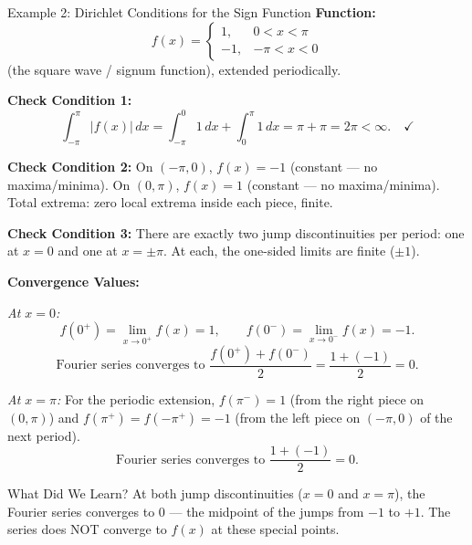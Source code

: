 \documentclass[12pt,a4paper]{article}
\begin{document}
\begin{infobox}{Example 2: Dirichlet Conditions for the Sign Function}
\textbf{Function:}
\[
   f(x) = \begin{cases} 1, & 0 < x < \pi \\ -1, & -\pi < x < 0 \end{cases}
\]
(the square wave / signum function), extended periodically.

\medskip
\textbf{Check Condition 1:}
\[
   \int_{-\pi}^{\pi} |f(x)|\,dx = \int_{-\pi}^{0} 1\,dx + \int_{0}^{\pi} 1\,dx = \pi + \pi = 2\pi < \infty. \quad \checkmark
\]

\textbf{Check Condition 2:}
On $(-\pi, 0)$, $f(x)=-1$ (constant --- no maxima/minima). On $(0,\pi)$, $f(x)=1$ (constant --- no maxima/minima). Total extrema: zero local extrema inside each piece, finite. \checkmark

\textbf{Check Condition 3:}
There are exactly two jump discontinuities per period: one at $x=0$ and one at $x=\pm\pi$. At each, the one-sided limits are finite ($\pm 1$). \checkmark

\medskip
\textbf{Convergence Values:}

\textit{At $x=0$:}
\[
   f(0^+) = \lim_{x\to 0^+} f(x) = 1, \qquad f(0^-) = \lim_{x\to 0^-} f(x) = -1.
\]
\[
   \text{Fourier series converges to } \frac{f(0^+)+f(0^-)}{2} = \frac{1+(-1)}{2} = \boxed{0}.
\]

\textit{At $x=\pi$:}
For the periodic extension, $f(\pi^-)=1$ (from the right piece on $(0,\pi)$) and $f(\pi^+)=f(-\pi^+)=-1$ (from the left piece on $(-\pi,0)$ of the next period).
\[
   \text{Fourier series converges to } \frac{1+(-1)}{2} = \boxed{0}.
\]
\end{infobox}

\begin{learnbox}{What Did We Learn?}
At both jump discontinuities ($x=0$ and $x=\pi$), the Fourier series converges to $0$ --- the midpoint of the jumps from $-1$ to $+1$. The series does NOT converge to $f(x)$ at these special points.
\end{learnbox}

\bigskip
\end{document}
